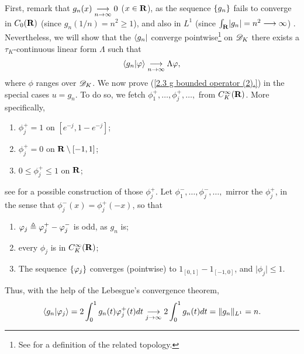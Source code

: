 %
First, remark that $g_n(x) \underset{n\to\infty}{\longrightarrow} 0$ ($x \in {\mathbf R}$), %
as the sequence $\{g_n\}$ fails to converge in $C_0({\mathbf R})$ %
%
  (since $g_n(1/n)= n^2 \geq 1$),  %
%
and also in $L^1$ %
%
  (since $\int_{\mathbf R} \lvert g_n \rvert = n^2 \longrightarrow{\infty}$)
. %
Nevertheless, we will show that %
%
  the $\bra{g_n}$ %
%
converge pointwise\footnote{
%
  See  for a definition of the related topology. %
%
} on ${\mathscr D}_K$ %
\ie %
there exists a $\tau_K$-continuous linear form $\Lambda$ such that %
%
  \begin{align}\label{2.3. Convergence in D_K, not vague.}
    \bra{g_n}\ket{\phi} \tendsto{n}{\infty} \Lambda \phi, %
  \end{align}
%
where $\phi$ ranges over ${\mathscr D}_K$. %
%
We now prove (\ref{2.3  g  bounded operator (2).}) in the special cases %
%
  $u = g_n$. %
%
To do so, we fetch %
%
  $\phi^{+}_{1}, \dots, \phi^{+}_{j}, \dots,$ from $C_K^\infty({\mathbf R})$. %
%
More specifically, %
%
  \begin{enumerate}
    \item{
      $\phi^{+}_{j} = 1$ on $[e^{\minus j}, 1-e^{\minus j}]$; 
    }%
    \item{
      $\phi^{+}_{j} = 0$ on ${\mathbf R}\setminus [-1, 1]$;%
    }
    \item{
      $0 \leq \phi^{+}_{j} \leq 1$ on ${\mathbf R}$; %
    }
  \end{enumerate}
%
see \citeresultFA{[1.46]} for a possible construction of those $\phi^{+}_{j}$. 
%
Let %
%
  $\phi^{-}_{1}, \dots, \phi^{-}_{j}, \dots,$ %
%
mirror the $\phi^{+}_{j}$, in the sense that %
%
  $\phi^{-}_{j}(x) = \phi^{+}_{j}(\minus x)$, %
%
so that %
%
  \begin{enumerate}\addtocounter{enumi}{3}
    \item{
      $\varphi_{j} \triangleq \varphi^{+}_{j} - \varphi^{-}_{j}$ is odd, as $g_n$ is;
    }
    \item{
      every $\phi_{j}$ is in $C_K^\infty({\mathbf R})$;
    }
    \item{
      The sequence $\{\varphi_j\}$ converges (pointwise) to %
      $1_{[0, 1]} - 1_{[\minus 1, 0]}$, and $\lvert\phi_{j} \rvert \leq 1$. %
    }
  \end{enumerate}
%
Thus, with the help of the Lebesgue's convergence theorem, 
%
  \begin{align}\label{2.3. Norm in the dual equals norm L1 (1).}
      \langle{g_n}\lvert{\varphi_j}\rangle
      = 
    2 \int_{0}^1 g_n(t) \varphi^{+}_{j}(t) d t
      \underset{j\to\infty}{\longrightarrow} 
    2 \int_{0}^1 g_n(t) d t
      = \| g_n \|_{L^1} = n.
  \end{align}
